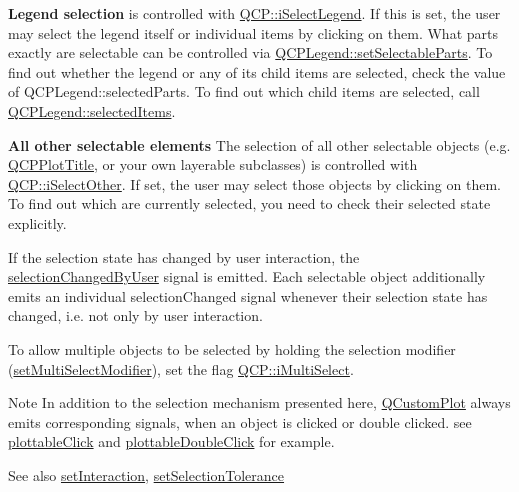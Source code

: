 {\bfseries Legend selection} is controlled with \hyperlink{namespaceQCP_a2ad6bb6281c7c2d593d4277b44c2b037a269c9af298e257d1108edec0432b5513}{Q\+C\+P\+::i\+Select\+Legend}. If this is set, the user may select the legend itself or individual items by clicking on them. What parts exactly are selectable can be controlled via \hyperlink{classQCPLegend_a9ce60aa8bbd89f62ae4fa83ac6c60110}{Q\+C\+P\+Legend\+::set\+Selectable\+Parts}. To find out whether the legend or any of its child items are selected, check the value of Q\+C\+P\+Legend\+::selected\+Parts. To find out which child items are selected, call \hyperlink{classQCPLegend_ac93eaf236e911d67aa8b88942ef45c5e}{Q\+C\+P\+Legend\+::selected\+Items}.

{\bfseries All other selectable elements} The selection of all other selectable objects (e.\+g. \hyperlink{classQCPPlotTitle}{Q\+C\+P\+Plot\+Title}, or your own layerable subclasses) is controlled with \hyperlink{namespaceQCP_a2ad6bb6281c7c2d593d4277b44c2b037af67a50bc26147a13b551b3a625374949}{Q\+C\+P\+::i\+Select\+Other}. If set, the user may select those objects by clicking on them. To find out which are currently selected, you need to check their selected state explicitly.

If the selection state has changed by user interaction, the \hyperlink{classQCustomPlot_a500c64a109bc773c973ad274f2fa4190}{selection\+Changed\+By\+User} signal is emitted. Each selectable object additionally emits an individual selection\+Changed signal whenever their selection state has changed, i.\+e. not only by user interaction.

To allow multiple objects to be selected by holding the selection modifier (\hyperlink{classQCustomPlot_a8fc96e3b5138a06759a2a90c166df516}{set\+Multi\+Select\+Modifier}), set the flag \hyperlink{namespaceQCP_a2ad6bb6281c7c2d593d4277b44c2b037aef673112c5067c3cf4cfddb62da7265d}{Q\+C\+P\+::i\+Multi\+Select}.

\begin{DoxyNote}{Note}
In addition to the selection mechanism presented here, \hyperlink{classQCustomPlot}{Q\+Custom\+Plot} always emits corresponding signals, when an object is clicked or double clicked. see \hyperlink{classQCustomPlot_a57e5efa8a854620e9bf62d31fc139f53}{plottable\+Click} and \hyperlink{classQCustomPlot_af2e6f1cea923dae437681d01ce7d0c31}{plottable\+Double\+Click} for example.
\end{DoxyNote}
\begin{DoxySeeAlso}{See also}
\hyperlink{classQCustomPlot_a422bf1bc6d56dac75a3d805d9a65902c}{set\+Interaction}, \hyperlink{classQCustomPlot_a4dc31241d7b09680950e19e5f971ed93}{set\+Selection\+Tolerance} 
\end{DoxySeeAlso}
